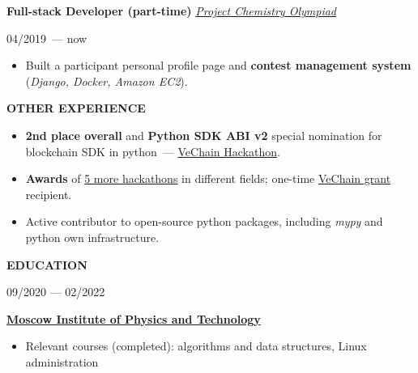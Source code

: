\documentclass[10pt]{article}
\newcommand{\cvrsect}[1]{
    \begin{tcolorbox}[
            sharp corners,
            enhanced,
            colback=rightSectionTitle,
            colframe=rightSectionTitle,
            coltext=leftBackground,
            left=0.5cm,
            right=0.5cm,
            bottom=4pt,
            top=4pt,
            width=\linewidth+8.5px,
            enlarge left by=-8.5px,
            fontupper=\large]
        \MakeUppercase{\textbf{#1}}
    \end{tcolorbox}
    \vspace*{-0.5\baselineskip+0.75em}
}
\def\leftcolumnwidth{0.3\textwidth}
\begin{document}
\begin{minipage}[t]{\textwidth - \leftcolumnwidth - 6pt}
    \vspace{1em}

    \textbf{Full-stack Developer (part-time)}
    \hfill
    \textit{\href{https://chemolymp.ru/}{Project Chemistry Olympiad}}

    \vspace{1em}

    \begin{minipage}{0.25\textwidth}
        04/2019~--- now
    \end{minipage}
    \begin{minipage}{0.75\textwidth}

        \begin{itemize}[topsep=4pt,parsep=0pt,leftmargin=*]
            \item
            \raggedright
            Built a participant personal profile page and \textbf{contest management system} (\textit{Django, Docker, Amazon EC2}).
        \end{itemize}
    \end{minipage}

    \cvrsect{Other experience}
    \vspace{-1em}
    \begin{itemize}
        \setlength\itemsep{0em}
        \item
        \raggedright
        \textbf{2nd place overall} and \textbf{Python SDK ABI v2} special nomination for blockchain SDK in python~--- \href{https://devpost.com/software/thor-devkit-py}{VeChain Hackathon}.

        \item
        \raggedright
        \textbf{Awards} of \href{https://devpost.com/sterliakov}{5 more hackathons} in different fields; one-time \href{https://vechain.org/grants/}{VeChain grant} recipient.

        \item
        \raggedright
        Active contributor to open-source python packages, including \textit{mypy} and python own infrastructure.
    \end{itemize}

    \cvrsect{Education}
    \begin{minipage}{0.25\textwidth}
        09/2020 --- 02/2022
    \end{minipage}
    \begin{minipage}{0.75\textwidth}
        \textbf{\href{https://mipt.ru/english/}{Moscow Institute of Physics and Technology}}

        \begin{itemize}[topsep=4pt,parsep=1pt,leftmargin=*]
            \item
            Relevant courses (completed): algorithms and data structures, Linux administration


\end{itemize}
\end{minipage}
\end{minipage}
\end{document}

